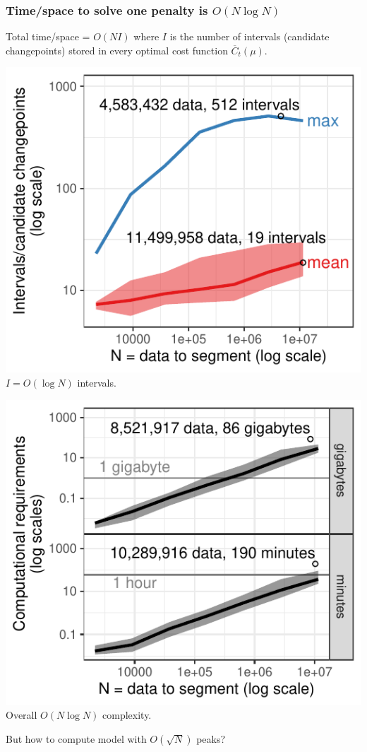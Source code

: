 \documentclass{beamer}
\begin{document}
\begin{frame}[fragile]
  \frametitle{Time/space to solve one penalty is $O(N \log N)$}

  Total time/space = $O(NI)$ where $I$ is the number of intervals
  (candidate changepoints) stored in every optimal cost function
  $\overline C_t(\mu)$.

  \begin{minipage}{0.48\textwidth}
    \includegraphics[width=\textwidth]{jss-figure-target-intervals-models}
    $I=O(\log N)$ intervals.
  \end{minipage}
  \begin{minipage}{0.48\textwidth}
    \includegraphics[width=\textwidth]{jss-figure-target-intervals-models-computation}
    Overall  $O(N \log N)$ complexity.
  \end{minipage}
  
\vskip 0.5cm
  But how to compute model with $O(\sqrt N)$ peaks?

\end{frame}
\end{document}
